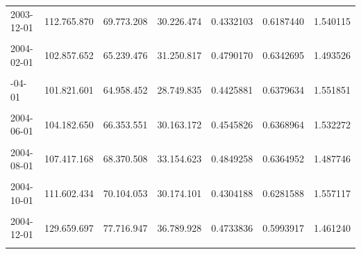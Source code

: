 \documentclass[12pt]{article}
\begin{document}
\begin{longtable}[t]{llllrrr}
2003-12-01 & 112.765.870 & 69.773.208 & 30.226.474 & 0.4332103 & 0.6187440 & 1.540115\\
\cellcolor{gray!10}{2004-01-01} & \cellcolor{gray!10}{101.206.857} & \cellcolor{gray!10}{62.924.185} & \cellcolor{gray!10}{30.617.097} & \cellcolor{gray!10}{0.4865712} & \cellcolor{gray!10}{0.6217384} & \cellcolor{gray!10}{1.468900}\\
2004-02-01 & 102.857.652 & 65.239.476 & 31.250.817 & 0.4790170 & 0.6342695 & 1.493526\\
\cellcolor{gray!10}{2004-03-01} & \cellcolor{gray!10}{101.282.219} & \cellcolor{gray!10}{65.156.928} & \cellcolor{gray!10}{26.997.337} & \cellcolor{gray!10}{0.4143433} & \cellcolor{gray!10}{0.6433205} & \cellcolor{gray!10}{1.604531}\\
\addlinespace
2004-04-01 & 101.821.601 & 64.958.452 & 28.749.835 & 0.4425881 & 0.6379634 & 1.551851\\
\cellcolor{gray!10}{2004-05-01} & \cellcolor{gray!10}{103.074.482} & \cellcolor{gray!10}{65.839.915} & \cellcolor{gray!10}{29.587.586} & \cellcolor{gray!10}{0.4493868} & \cellcolor{gray!10}{0.6387606} & \cellcolor{gray!10}{1.542520}\\
2004-06-01 & 104.182.650 & 66.353.551 & 30.163.172 & 0.4545826 & 0.6368964 & 1.532272\\
\cellcolor{gray!10}{2004-07-01} & \cellcolor{gray!10}{104.856.804} & \cellcolor{gray!10}{65.368.248} & \cellcolor{gray!10}{33.621.872} & \cellcolor{gray!10}{0.5143456} & \cellcolor{gray!10}{0.6234049} & \cellcolor{gray!10}{1.434225}\\
2004-08-01 & 107.417.168 & 68.370.508 & 33.154.623 & 0.4849258 & 0.6364952 & 1.487746\\
\addlinespace
\cellcolor{gray!10}{2004-09-01} & \cellcolor{gray!10}{111.720.476} & \cellcolor{gray!10}{71.352.499} & \cellcolor{gray!10}{30.587.283} & \cellcolor{gray!10}{0.4286785} & \cellcolor{gray!10}{0.6386698} & \cellcolor{gray!10}{1.574520}\\
2004-10-01 & 111.602.434 & 70.104.053 & 30.174.101 & 0.4304188 & 0.6281588 & 1.557117\\
\cellcolor{gray!10}{2004-11-01} & \cellcolor{gray!10}{115.140.420} & \cellcolor{gray!10}{73.045.476} & \cellcolor{gray!10}{33.002.657} & \cellcolor{gray!10}{0.4518097} & \cellcolor{gray!10}{0.6344034} & \cellcolor{gray!10}{1.533210}\\
2004-12-01 & 129.659.697 & 77.716.947 & 36.789.928 & 0.4733836 & 0.5993917 & 1.461240\\
\cellcolor{gray!10}{2005-01-01} & \cellcolor{gray!10}{120.494.681} & \cellcolor{gray!10}{75.218.161} & \cellcolor{gray!10}{38.194.815} & \cellcolor{gray!10}{0.5077871} & \cellcolor{gray!10}{0.6242447} & \cellcolor{gray!10}{1.443546}\\

\end{longtable}
\end{document}
